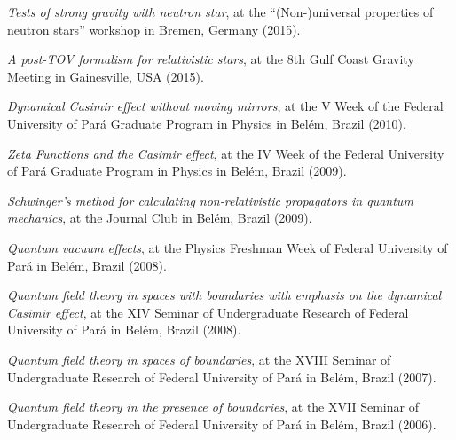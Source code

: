\documentclass[11pt]{article}
\begin{document}
\begin{etaremune}[topsep=0pt,partopsep=0pt]
    \item
    \emph{Tests of strong gravity with neutron star},
    at the ``(Non-)universal properties of neutron stars'' workshop
    in Bremen, Germany (2015).

    \item
    \emph{A post-TOV formalism for relativistic stars},
    at the 8th Gulf Coast Gravity Meeting
    in Gainesville, USA (2015).

    \item
    \emph{Dynamical Casimir effect without moving mirrors},
    at the V Week of the Federal University of Par\'a Graduate Program in Physics
    in Bel\'em, Brazil (2010).

    \item
    \emph{Zeta Functions and the Casimir effect},
    at the IV Week of the Federal University of Par\'a Graduate Program in Physics
    in Bel\'em, Brazil (2009).

    \item
    \emph{Schwinger's method for calculating non-relativistic
    propagators in quantum mechanics},
    at the Journal Club
    in Bel\'em, Brazil (2009).

    \item
    \emph{Quantum vacuum effects},
    at the Physics Freshman Week of Federal University of Par\'a
    in Bel\'em, Brazil (2008).

    \item
    \emph{Quantum field theory in spaces with boundaries
    with emphasis on the dynamical Casimir effect},
    at the XIV Seminar of Undergraduate Research of
    Federal University of Par\'a
    in Bel\'em, Brazil (2008).

    \item
    \emph{Quantum field theory in spaces of boundaries},
    at the XVIII Seminar of Undergraduate Research of
    Federal University of Par\'a
    in Bel\'em, Brazil (2007).

    \item
    \emph{Quantum field theory in the presence of boundaries},
    at the XVII Seminar of Undergraduate Research of
    Federal University of Par\'a
    in Bel\'em, Brazil (2006).
\end{etaremune}
\end{document}
